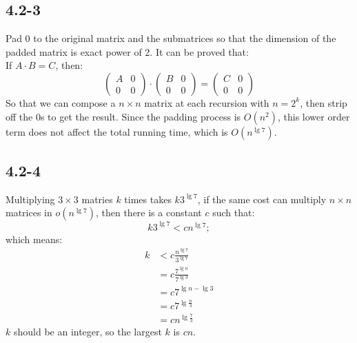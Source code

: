 \subsection{4.2-3}
    Pad 0 to the original matrix and the submatrices so that the dimension of
    the padded matrix is exact power of 2. It can be proved that: \\
    If $A\cdot B = C$, then:
    \begin{displaymath}
        \begin{pmatrix} A & 0 \\ 0 & 0 \end{pmatrix} \cdot
        \begin{pmatrix} B & 0 \\ 0 & 0 \end{pmatrix} =
        \begin{pmatrix} C & 0 \\ 0 & 0 \end{pmatrix}
    \end{displaymath}
    So that we can compose a $n \times n$ matrix at each recursion with $n =
    2^k$, then strip off the 0s to get the result. Since the padding process
    is $O(n^2)$, this lower order term does not affect the total running time,
    which is $O(n^{\lg 7})$.
\subsection{4.2-4}
    Multiplying $3 \times 3$ matries $k$ times takes $k3^{\lg 7}$, if the same
    cost can multiply $n \times n$ matrices in $o(n^{\lg 7})$, then there is
    a constant $c$ such that:
    \begin{displaymath}
        k3^{\lg 7} < cn^{\lg 7};
    \end{displaymath}
    which means:
    \begin{align*}
        k & < c\frac{n^{\lg 7}}{3^{\lg 7}} \\
          & = c\frac{7^{\lg n}}{7^{\lg 3}} \\
          & = c7^{\lg n - \lg 3} \\
          & = c7^{\lg \frac{n}{3}} \\
          & = cn^{\lg \frac{7}{3}}
    \end{align*}
    $k$ should be an integer, so the largest $k$ is $cn$.
